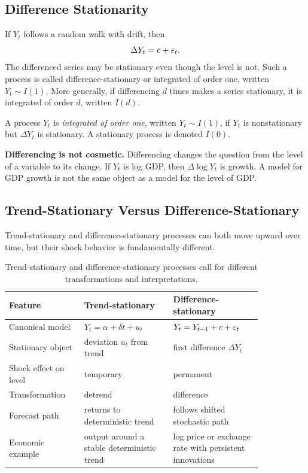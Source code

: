 \subsection{Difference Stationarity}
If $Y_t$ follows a random walk with drift, then
\[
\Delta Y_t=c+\varepsilon_t.
\]
The differenced series may be stationary even though the level is not. Such a process is called difference-stationary or integrated of order one, written $Y_t\sim I(1)$. More generally, if differencing $d$ times makes a series stationary, it is integrated of order $d$, written $I(d)$.

\begin{defN}
A process $Y_t$ is \emph{integrated of order one}, written $Y_t\sim I(1)$, if $Y_t$ is nonstationary but $\Delta Y_t$ is stationary. A stationary process is denoted $I(0)$.
\end{defN}

\begin{boxF}
\textbf{Differencing is not cosmetic.}
Differencing changes the question from the level of a variable to its change. If $Y_t$ is log GDP, then $\Delta \log Y_t$ is growth. A model for GDP growth is not the same object as a model for the level of GDP.
\end{boxF}

\subsection{Trend-Stationary Versus Difference-Stationary}
Trend-stationary and difference-stationary processes can both move upward over time, but their shock behavior is fundamentally different.

\begin{table}[h]
\centering
\small
\begin{tabular}{p{0.24\linewidth}p{0.30\linewidth}p{0.30\linewidth}}
\toprule
Feature & Trend-stationary & Difference-stationary \\
\midrule
Canonical model & $Y_t=\alpha+\delta t+u_t$ & $Y_t=Y_{t-1}+c+\varepsilon_t$ \\
Stationary object & deviation $u_t$ from trend & first difference $\Delta Y_t$ \\
Shock effect on level & temporary & permanent \\
Transformation & detrend & difference \\
Forecast path & returns to deterministic trend & follows shifted stochastic path \\
Economic example & output around a stable deterministic trend & log price or exchange rate with persistent innovations \\
\bottomrule
\end{tabular}
\caption{Trend-stationary and difference-stationary processes call for different transformations and interpretations.}
\label{tab:ts_vs_ds}
\end{table}


